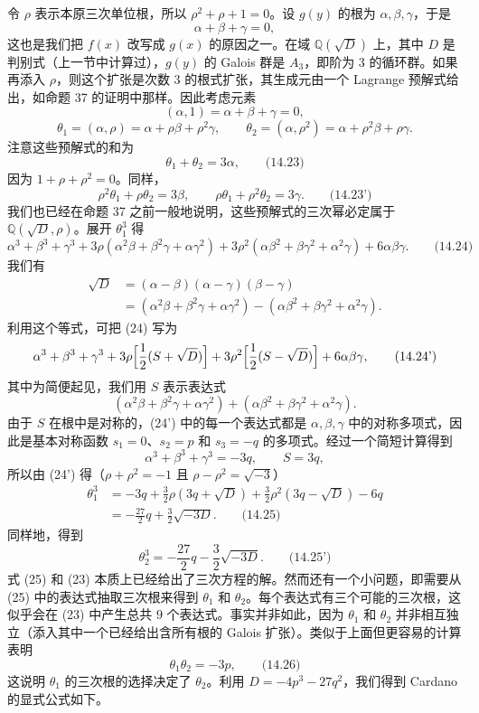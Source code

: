 令 $\rho$ 表示本原三次单位根，所以 $\rho^2+\rho+1=0$。设 $g(y)$ 的根为 $\alpha,\beta,\gamma$，于是
\[
\alpha+\beta+\gamma=0,
\]
这也是我们把 $f(x)$ 改写成 $g(x)$ 的原因之一。在域 $\mathbb Q(\sqrt D)$ 上，其中 $D$ 是判别式（上一节中计算过），$g(y)$ 的 Galois 群是 $A_3$，即阶为 $3$ 的循环群。如果再添入 $\rho$，则这个扩张是次数 $3$ 的根式扩张，其生成元由一个 Lagrange 预解式给出，如命题 37 的证明中那样。因此考虑元素
\[
(\alpha,1)=\alpha+\beta+\gamma=0,
\]
\[
\theta_1=(\alpha,\rho)=\alpha+\rho\beta+\rho^2\gamma,
\qquad
\theta_2=(\alpha,\rho^2)=\alpha+\rho^2\beta+\rho\gamma.
\]
注意这些预解式的和为
\[
\theta_1+\theta_2=3\alpha, \qquad\text{(14.23)}
\]
因为 $1+\rho+\rho^2=0$。同样，
\[
\rho^2\theta_1+\rho\theta_2=3\beta,
\qquad
\rho\theta_1+\rho^2\theta_2=3\gamma. \qquad\text{(14.23')}
\]
我们也已经在命题 37 之前一般地说明，这些预解式的三次幂必定属于 $\mathbb Q(\sqrt D,\rho)$。展开 $\theta_1^3$ 得
\[
\alpha^3+\beta^3+\gamma^3
+3\rho(\alpha^2\beta+\beta^2\gamma+\alpha\gamma^2)
+3\rho^2(\alpha\beta^2+\beta\gamma^2+\alpha^2\gamma)
+6\alpha\beta\gamma. \qquad\text{(14.24)}
\]
我们有
\[
\begin{aligned}
\sqrt D&=(\alpha-\beta)(\alpha-\gamma)(\beta-\gamma)\\
&=(\alpha^2\beta+\beta^2\gamma+\alpha\gamma^2)
-(\alpha\beta^2+\beta\gamma^2+\alpha^2\gamma).
\end{aligned}
\]
利用这个等式，可把 (24) 写为
\[
\alpha^3+\beta^3+\gamma^3
+3\rho\Bigl[\frac12(S+\sqrt D)\Bigr]
+3\rho^2\Bigl[\frac12(S-\sqrt D)\Bigr]
+6\alpha\beta\gamma, \qquad\text{(14.24')}
\]
其中为简便起见，我们用 $S$ 表示表达式
\[
(\alpha^2\beta+\beta^2\gamma+\alpha\gamma^2)
+(\alpha\beta^2+\beta\gamma^2+\alpha^2\gamma).
\]
由于 $S$ 在根中是对称的，(24') 中的每一个表达式都是 $\alpha,\beta,\gamma$ 中的对称多项式，因此是基本对称函数 $s_1=0$、$s_2=p$ 和 $s_3=-q$ 的多项式。经过一个简短计算得到
\[
\alpha^3+\beta^3+\gamma^3=-3q,
\qquad
S=3q,
\]
所以由 (24') 得（$\rho+\rho^2=-1$ 且 $\rho-\rho^2=\sqrt{-3}$）
\[
\begin{aligned}
\theta_1^3
&=-3q+\frac32\rho(3q+\sqrt D)+\frac32\rho^2(3q-\sqrt D)-6q\\
&=-\frac{27}{2}q+\frac32\sqrt{-3D}. \qquad\text{(14.25)}
\end{aligned}
\]
同样地，得到
\[
\theta_2^3=-\frac{27}{2}q-\frac32\sqrt{-3D}. \qquad\text{(14.25')}
\]
式 (25) 和 (23) 本质上已经给出了三次方程的解。然而还有一个小问题，即需要从 (25) 中的表达式抽取三次根来得到 $\theta_1$ 和 $\theta_2$。每个表达式有三个可能的三次根，这似乎会在 (23) 中产生总共 $9$ 个表达式。事实并非如此，因为 $\theta_1$ 和 $\theta_2$ 并非相互独立（添入其中一个已经给出含所有根的 Galois 扩张）。类似于上面但更容易的计算表明
\[
\theta_1\theta_2=-3p, \qquad\text{(14.26)}
\]
这说明 $\theta_1$ 的三次根的选择决定了 $\theta_2$。利用 $D=-4p^3-27q^2$，我们得到 Cardano 的显式公式如下。


